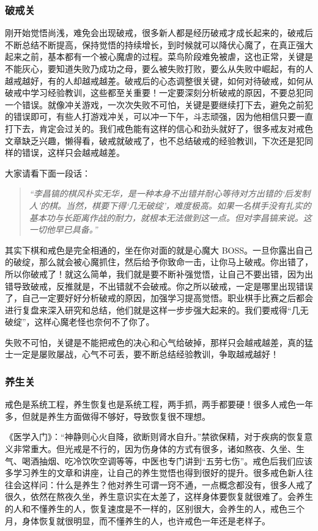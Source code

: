 \documentclass{ctexart}
\begin{document}
\subsubsection{破戒关}

刚开始觉悟尚浅，难免会出现破戒，很多新人都是经历破戒才成长起来的，破戒后不断总结不断提高，保持觉悟的持续增长，到时候就可以降伏心魔了，在真正强大起来之前，基本都有一个被心魔虐的过程。菜鸟阶段难免被虐，这也正常，关键是不能灰心，要知道失败乃成功之母，要么被失败打败，要么从失败中崛起，有的人越戒越好，有的人却越戒越差。破戒后的心态调整很关键，如何对待破戒，如何从破戒中学习经验教训，这些都至关重要！一定要深刻分析破戒的原因，不要总犯同一个错误。就像冲关游戏，一次次失败不可怕，关键是要继续打下去，避免之前犯的错误即可，有些人打游戏冲关，可以冲一下午，斗志顽强，因为他相信只要一直打下去，肯定会过关的。我们戒色能有这样的信心和劲头就好了，很多戒友对戒色文章缺乏兴趣，懒得看，破戒就破戒了，也不总结破戒的经验教训，下次还是犯同样的错误，这样只会越戒越差。

大家请看下面一段话：

\begin{quote}\it
    “李昌镐的棋风朴实无华，是一种本身不出错并耐心等待对方出错的‘后发制人’的棋。当然，棋要下得‘几无破绽’，难度极高。如果一名棋手没有扎实的基本功与长距离作战的耐力，就根本无法做到这一点。但对李昌镐来说。这一切他早已具备。”
\end{quote}

其实下棋和戒色是完全相通的，坐在你对面的就是心魔大 BOSS。一旦你露出自己的破绽，那么就会被心魔抓住，然后给予你致命一击，让你马上破戒。你出错了，所以你破戒了！就这么简单，我们就是要不断补强觉悟，让自己不要出错，因为出错导致破戒，反推就是，不出错就不会破戒。你之所以破戒，一定是哪里出现错误了，自己一定要好好分析破戒的原因，加强学习提高觉悟。职业棋手比赛之后都会进行复盘来深入研究和总结，他们就是这样一步步强大起来的。我们要戒得“几无破绽”，这样心魔老怪也奈何不了你了。

失败不可怕，关键是不能把戒色的决心和心气给破掉，那样只会越戒越差，真的猛士一定是屡败屡战，心气不可丢，要不断总结经验教训，争取越戒越好！

\subsubsection{养生关}

戒色是系统工程，养生恢复也是系统工程，两手抓，两手都要硬！很多人戒色一年多，但就是养生方面做得不够好，导致恢复很不理想。

《医学入门》：“神静则心火自降，欲断则肾水自升。”禁欲保精，对于疾病的恢复意义非常重大。但光戒是不行的，因为伤身体的方式有很多，诸如熬夜、久坐、生气、喝酒抽烟、吃冷饮吹空调等等，中医也专门讲到“五劳七伤”。戒色后我们应该多学习养生的文章和讲座，让自己的养生觉悟也得到很好的提升。很多戒色新人往往会这样问：什么是养生？他对养生可谓一窍不通，一点概念都没有，很多人戒了很久，依然在熬夜久坐，养生意识实在太差了，这样身体要恢复就很难了。会养生的人和不懂养生的人，恢复速度是不一样的，区别很大，会养生的人，戒色三个月，身体恢复就很明显，而不懂养生的人，也许戒色一年还是老样子。
\end{document}
